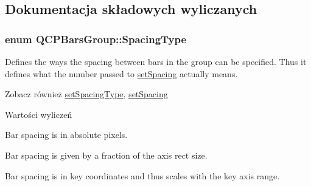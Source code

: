 \subsection{Dokumentacja składowych wyliczanych}
\subsubsection[{\texorpdfstring{Spacing\+Type}{SpacingType}}]{\setlength{\rightskip}{0pt plus 5cm}enum {\bf Q\+C\+P\+Bars\+Group\+::\+Spacing\+Type}}\hypertarget{class_q_c_p_bars_group_a4c0521120a97e60bbca37677a37075b6}{}\label{class_q_c_p_bars_group_a4c0521120a97e60bbca37677a37075b6}
Defines the ways the spacing between bars in the group can be specified. Thus it defines what the number passed to \hyperlink{class_q_c_p_bars_group_aa553d327479d72a0c3dafcc724a190e2}{set\+Spacing} actually means.

\begin{DoxySeeAlso}{Zobacz również}
\hyperlink{class_q_c_p_bars_group_a2c7e2d61b10594a4555b615e1fcaf49e}{set\+Spacing\+Type}, \hyperlink{class_q_c_p_bars_group_aa553d327479d72a0c3dafcc724a190e2}{set\+Spacing} 
\end{DoxySeeAlso}
\begin{Desc}
\item[Wartości wyliczeń]\par
\begin{description}
\item[{\em 
st\+Absolute\hypertarget{class_q_c_p_bars_group_a4c0521120a97e60bbca37677a37075b6ab53fa3efaf14867dd0f14d41d64e42ac}{}\label{class_q_c_p_bars_group_a4c0521120a97e60bbca37677a37075b6ab53fa3efaf14867dd0f14d41d64e42ac}
}]Bar spacing is in absolute pixels. \item[{\em 
st\+Axis\+Rect\+Ratio\hypertarget{class_q_c_p_bars_group_a4c0521120a97e60bbca37677a37075b6ae94b05c27bc985dcdd8b1e1b7f163d26}{}\label{class_q_c_p_bars_group_a4c0521120a97e60bbca37677a37075b6ae94b05c27bc985dcdd8b1e1b7f163d26}
}]Bar spacing is given by a fraction of the axis rect size. \item[{\em 
st\+Plot\+Coords\hypertarget{class_q_c_p_bars_group_a4c0521120a97e60bbca37677a37075b6ad369cee6287e0a86e8c2b643a3168c54}{}\label{class_q_c_p_bars_group_a4c0521120a97e60bbca37677a37075b6ad369cee6287e0a86e8c2b643a3168c54}
}]Bar spacing is in key coordinates and thus scales with the key axis range. \end{description}
\end{Desc}


